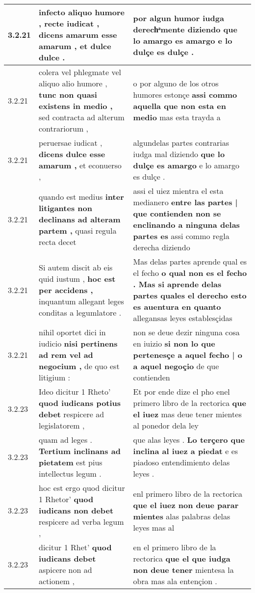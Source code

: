 \begin{tabular}{|p{1cm}|p{6.5cm}|p{6.5cm}|}
3.2.21 & infecto aliquo humore , recte iudicat , \textbf{ dicens amarum esse amarum , } et dulce dulce . & por algun humor iudga derechͣmente diziendo \textbf{ que lo amargo es amargo } e lo dulçe es dulçe . \\\hline
3.2.21 & colera vel phlegmate vel aliquo alio humore , \textbf{ tunc non quasi existens in medio , } sed contracta ad alterum contrariorum , & o por alguno de los otros humores estonçe \textbf{ assi commo aquella que non esta en medio } mas esta trayda a \\\hline
3.2.21 & peruersae iudicat , \textbf{ dicens dulce esse amarum , } et econuerso , & algundelas partes contrarias iudga mal diziendo \textbf{ que lo dulçe es amargo } e lo amargo es dulçe . \\\hline
3.2.21 & quando est medius \textbf{ inter litigantes non declinans ad alteram partem , } quasi regula recta decet & assi el uiez mientra el esta medianero \textbf{ entre las partes | que contienden non se enclinando a ninguna delas partes es } assi commo regla derecha diziendo \\\hline
3.2.21 & Si autem discit ab eis quid iustum , \textbf{ hoc est per accidens , } inquantum allegant leges conditas a legumlatore . & Mas delas partes aprende qual es el fecho \textbf{ o qual non es el fecho . Mas si aprende delas partes quales el derecho esto es auentura en quanto } allegansas leyes establesçidas \\\hline
3.2.21 & nihil oportet dici in iudicio \textbf{ nisi pertinens ad rem vel ad negocium , } de quo est litigium : & non se deue dezir ninguna cosa en iuizio \textbf{ si non lo que pertenesçe a aquel fecho | o a aquel negoçio } de que contienden \\\hline
3.2.23 & Ideo dicitur 1 Rheto’ \textbf{ quod iudicans potius debet } respicere ad legislatorem , & Et por ende dize el pho enel primero libro de la rectorica \textbf{ que el iuez } mas deue tener mientes al ponedor dela ley \\\hline
3.2.23 & quam ad leges . \textbf{ Tertium inclinans ad pietatem } est pius intellectus legum . & que alas leyes . \textbf{ Lo terçero que inclina al iuez a piedat } e es piadoso entendimiento delas leyes . \\\hline
3.2.23 & hoc est ergo quod dicitur 1 Rhetor’ \textbf{ quod iudicans non debet } respicere ad verba legum , & enl primero libro de la rectorica \textbf{ que el iuez non deue parar mientes } alas palabras delas leyes mas al \\\hline
3.2.23 & dicitur 1 Rhet’ \textbf{ quod iudicans debet } aspicere non ad actionem , & en el primero libro de la rectorica \textbf{ que el que iudga non deue tener } mientesa la obra mas ala entençion . \\\hline

\end{tabular}

